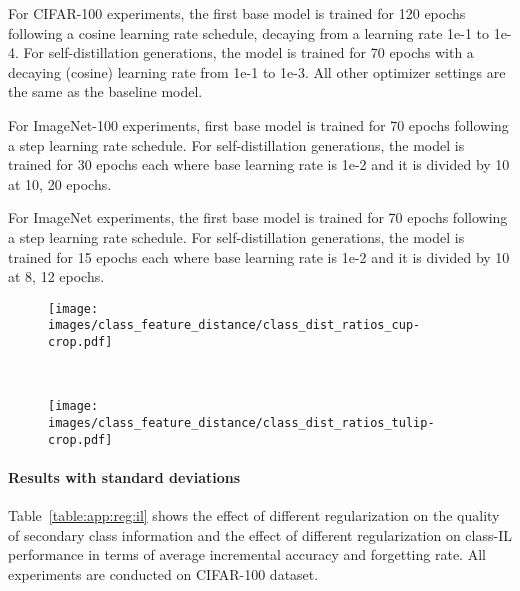\documentclass[final]{cvpr}
\newcommand{\ilkd}{CCIL }
\begin{document}
For CIFAR-100 experiments, the first base model is trained for 120 epochs following a cosine learning rate schedule, decaying from a learning rate 1e-1 to 1e-4. For self-distillation generations, the model is trained for 70 epochs with a decaying (cosine) learning rate from 1e-1 to 1e-3. All other optimizer settings are the same as the baseline model.

For ImageNet-100 experiments, first base model is trained for 70 epochs following a step learning rate schedule. For self-distillation generations, the model is trained for 30 epochs each where base learning rate is 1e-2 and it is divided by 10 at {10, 20} epochs.

For ImageNet experiments, the first base model is trained for 70 epochs following a step learning rate schedule. For self-distillation generations, the model is trained for 15 epochs each where base learning rate is 1e-2 and it is divided by 10 at {8, 12} epochs.



\begin{figure*}[!t]
    \centering
    \begin{subfigure}{0.40\textwidth}
        \centering
        \texttt{[image: images/class\_feature\_distance/class\_dist\_ratios\_cup-crop.pdf]}
        \caption{}
    \end{subfigure}~ 
    \begin{subfigure}{0.40\textwidth}
        \centering
        \texttt{[image: images/class\_feature\_distance/class\_dist\_ratios\_tulip-crop.pdf]}
        \caption{}
    \end{subfigure}
    \caption{Effect of regularizers on the distance between mean class representations. 
    The numbers shown in the plot are the ratios between the class means distances of each method and of the default \ilkd model.
    Similar classes are marked in \textbf{bold}.\textit{ Dotted} circle at 1.0 depicts distances between classes in the baseline \ilkd model and other distances are depicted relative to the baseline model. \textit{Positive} and \textit{negative} cases indicate similar and dissimilar classes respectively.  }   
    \label{fig:app:class_mean}
\end{figure*}

\paragraph{Results with standard deviations}
Table~\ref{table:app:reg:il} shows the effect of different regularization on the quality of secondary class information and the effect of different regularization on class-IL performance in terms of average incremental accuracy and forgetting rate. All experiments are conducted on CIFAR-100 dataset. 
\end{document}
